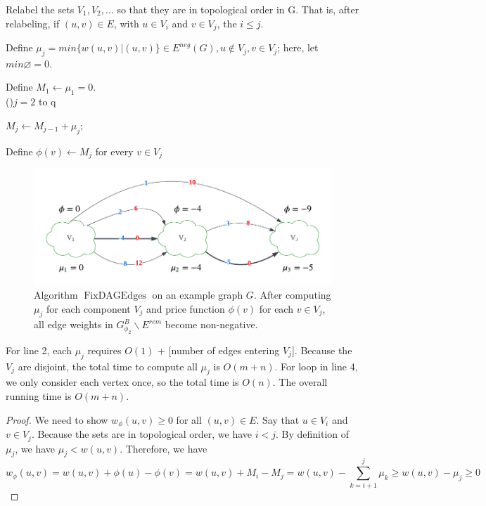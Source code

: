 \documentclass[11pt]{article}
\newcommand{\FixAlmostDag}{\operatorname{FixDAGEdges}}
\newcommand{\eneg}{E^{neg}}
\newcommand{\esep}{E^{rem}}
\begin{document}
\begin{algorithm2e}[H]
\caption{$\FixAlmostDag(G=(V, E, w), P=\{V_1, V_2, ...\}$}

Relabel the sets $V_1, V_2, ...$ so that they are in topological order in G. That is, after relabeling, if $(u, v) \in E$, with $u \in V_i$ and $v \in V_j$, the $i \le j$.

Define $\mu_j = min\{w(u, v) | (u, v)\} \in \eneg(G), u \notin V_j, v \in V_j$; here, let $min{\varnothing} = 0$.


Define $M_1 \gets \mu_1 = 0$.\\

\For(){$j = 2$ to q}{ 
$M_j \gets M_{j-1} + \mu_j$; 

Define $\phi(v) \gets M_j$ for every $v \in V_j$
}

\Return{$\phi$}
\end{algorithm2e}

\begin{figure}[ht]
    \centering
    \includegraphics[width=0.9\linewidth]{images/phase2.pdf}
    \caption{Algorithm $\FixAlmostDag$ on an example graph $G$. After computing $\mu_j$ for each component $V_j$ and price function $\phi(v)$ for each $v \in V_j$, all edge weights in $G^B_{\phi_2} \backslash \esep$ become non-negative.}
\end{figure}

For line 2, each $\mu_j$ requires $O(1)$ + [number of edges entering $V_j$]. Because the $V_j$ are disjoint, the total time to compute all $\mu_j$ is $O(m + n)$. For loop in line 4, we only consider each vertex once, so the total time is $O(n)$. The overall running time is $O(m+n)$.

\begin{proof}
We need to show $w_\phi(u, v) \ge 0$ for all $(u, v) \in E$.
Say that $u \in V_i$ and $v \in V_j$. Because the sets are in topological order, we have $i < j$. By definition of $\mu_j$, we have $\mu_j < w(u, v)$. Therefore, we have
$$w_\phi(u, v) = w(u, v) + \phi(u) - \phi(v) = w(u, v) + M_i - M_j = w(u, v) - \sum_{k=i+1}^{j}\mu_k \ge w(u, v) - \mu_j  \ge 0 $$
\end{proof}
\end{document}
